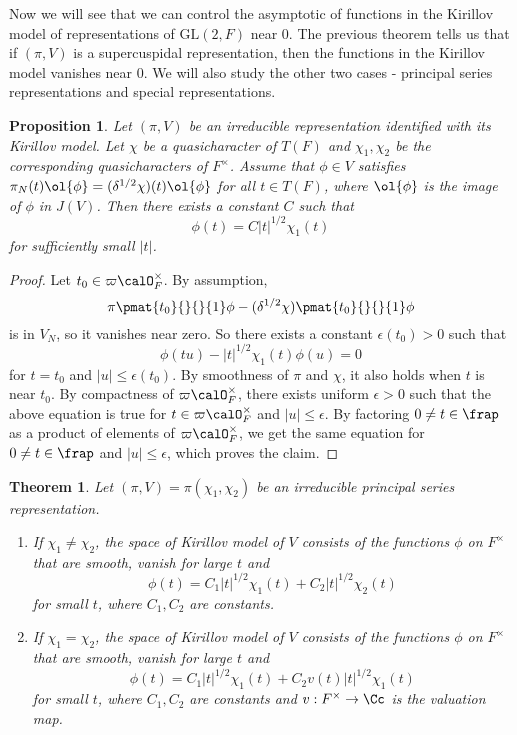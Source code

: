 \documentclass{article}
\newtheorem{theorem}{Theorem}[section]
\newcommand{\GL}{\mathrm{GL}}
\newtheorem{proposition}{Proposition}[section]
\begin{document}
Now we will see that we can control the asymptotic of functions in the Kirillov model of representations of $\GL(2, F)$ near 0. 
The previous theorem tells us that if $(\pi, V)$ is a supercuspidal representation, then the functions in the Kirillov model vanishes near 0. 
We will also study the other two cases - principal series representations and special representations. 
\begin{proposition}
Let $(\pi, V)$ be an irreducible representation identified with its Kirillov model. 
Let $\chi$ be a quasicharacter of $T(F)$ and $\chi_1, \chi_2$ be the corresponding quasicharacters of $F^{\times}$. 
Assume that $\phi\in V$ satisfies $\pi_N(t)\ol{\phi} = (\delta^{1/2}\chi)(t)\ol{\phi}$ for all $t\in T(F)$, where $\ol{\phi}$ is the image of $\phi$ in $J(V)$. 
Then there exists a constant $C$ such that
$$
\phi(t) = C|t|^{1/2}\chi_1(t)
$$
for sufficiently small $|t|$. 
\end{proposition}
\begin{proof}
Let $t_0 \in \varpi\calO_F^{\times}$. 
By assumption, 
$$
\pi\pmat{t_0}{}{}{1}\phi - (\delta^{1/2}\chi)\pmat{t_0}{}{}{1} \phi
$$
is in $V_N$, so it vanishes near zero. 
So there exists a constant $\epsilon(t_0)>0$ such that 
$$
\phi(tu) - |t|^{1/2}\chi_1(t)\phi(u) = 0
$$
for $t = t_0$ and $|u|\leq \epsilon(t_0)$. 
By smoothness of $\pi$ and $\chi$, it also holds when $t$ is near $t_0$. 
By compactness of $\varpi \calO_F^{\times}$, there exists uniform $\epsilon >0$ such that the above equation is true for $t\in \varpi \calO_{F}^{\times}$ and $|u|\leq \epsilon$. 
By factoring $0\neq t\in \frap$ as a product of elements of $\varpi \calO_{F}^{\times}$, we get the same equation for $0\neq t\in \frap$ and $|u|\leq \epsilon$, which proves the claim. 
\end{proof}
\begin{theorem}
\label{pskr}
Let $(\pi, V) = \pi(\chi_1, \chi_2)$ be an irreducible principal series representation. 
\begin{enumerate}
\item If $\chi_1 \neq \chi_2$, the space of Kirillov model of $V$ consists of the functions $\phi$ on $F^{\times}$ that are smooth, vanish for large $t$ and 
$$
\phi(t) = C_{1}|t|^{1/2}\chi_{1}(t) + C_{2}|t|^{1/2}\chi_2(t)
$$
for small $t$, where $C_1, C_2$ are constants. 
\item If $\chi_1 = \chi_2$, the space of Kirillov model of $V$ consists of the functions $\phi$ on $F^{\times}$ that are smooth, vanish for large $t$ and 
$$
\phi(t) = C_{1}|t|^{1/2} \chi_{1}(t) + C_{2}v(t)|t|^{1/2}\chi_{1}(t)
$$
for small $t$, where $C_1, C_2$ are constants and $v:F^{\times} \to \Cc$ is the valuation map. 
\end{enumerate}
\end{theorem}
\end{document}
